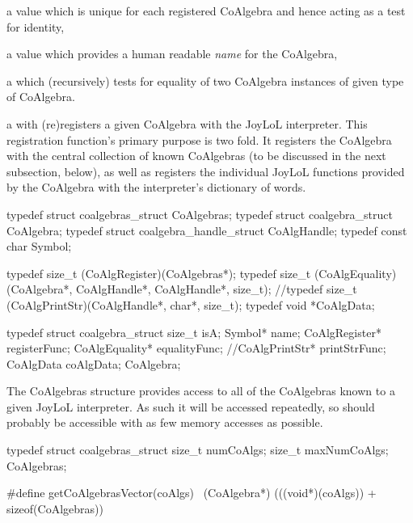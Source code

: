 \startitemize

\item a  value which is unique for each registered CoAlgebra 
and hence acting as a test for identity, 

\item a  value which provides a human readable \emph{name} 
for the CoAlgebra, 

\item a  which (recursively) tests for equality of two 
CoAlgebra instances of given type of CoAlgebra.

\item a  with (re)registers a given CoAlgebra with the 
JoyLoL interpreter. This registration function's primary purpose is two 
fold. It registers the CoAlgebra with the central collection of known 
CoAlgebras (to be discussed in the next subsection, below), as well as 
registers the individual JoyLoL functions provided by the CoAlgebra with 
the interpreter's dictionary of words. 

\stopitemize

\startCHeader
typedef struct coalgebras_struct        CoAlgebras;
typedef struct coalgebra_struct         CoAlgebra;
typedef struct coalgebra_handle_struct  CoAlgHandle;
typedef const char Symbol;

typedef size_t (CoAlgRegister)(CoAlgebras*);
typedef size_t (CoAlgEquality)(CoAlgebra*,
                               CoAlgHandle*,
                               CoAlgHandle*,
                               size_t);
//typedef size_t (CoAlgPrintStr)(CoAlgHandle*, char*, size_t);
typedef void *CoAlgData;

typedef struct coalgebra_struct {
  size_t          isA;
  Symbol*         name;
  CoAlgRegister*  registerFunc;
  CoAlgEquality*  equalityFunc;
  //CoAlgPrintStr*  printStrFunc;
  CoAlgData       coAlgData;
} CoAlgebra;
\stopCHeader

\startTestSuite[registerCoAlgebra]

The CoAlgebras structure provides access to all of the CoAlgebras known to 
a given JoyLoL interpreter. As such it will be accessed repeatedly, so 
should probably be accessible with as few memory accesses as possible. 

\startCHeader
typedef struct coalgebras_struct {
  size_t numCoAlgs;
  size_t maxNumCoAlgs;
} CoAlgebras;

#define getCoAlgebrasVector(coAlgs) \
  (CoAlgebra*) (((void*)(coAlgs)) + sizeof(CoAlgebras))

